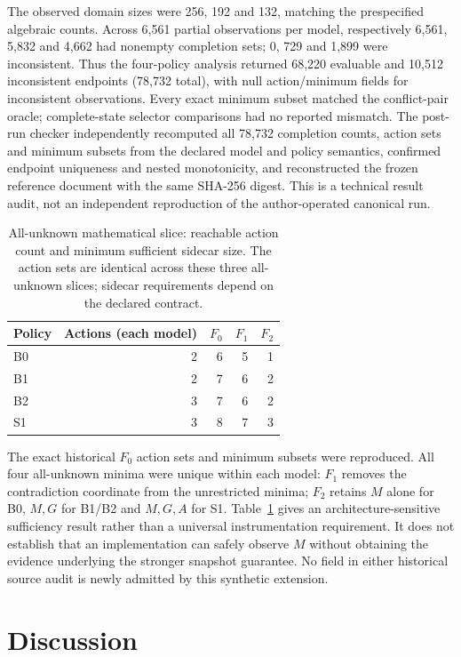 \documentclass[preprint,12pt]{elsarticle}
\begin{document}
The observed domain sizes were 256, 192 and 132, matching the prespecified algebraic counts. Across 6,561 partial observations per model, respectively 6,561, 5,832 and 4,662 had nonempty completion sets; 0, 729 and 1,899 were inconsistent. Thus the four-policy analysis returned 68,220 evaluable and 10,512 inconsistent endpoints (78,732 total), with null action/minimum fields for inconsistent observations. Every exact minimum subset matched the conflict-pair oracle; complete-state selector comparisons had no reported mismatch. The post-run checker independently recomputed all 78,732 completion counts, action sets and minimum subsets from the declared model and policy semantics, confirmed endpoint uniqueness and nested monotonicity, and reconstructed the frozen reference document with the same SHA-256 digest. This is a technical result audit, not an independent reproduction of the author-operated canonical run.

\begin{table}[H]
\centering
\small
\caption{All-unknown mathematical slice: reachable action count and minimum sufficient sidecar size. The action sets are identical across these three all-unknown slices; sidecar requirements depend on the declared contract.}
\label{tab:extensionsidecar}
\begin{tabular}{lrrrr}
\toprule
Policy & Actions (each model) & $F_0$ & $F_1$ & $F_2$ \\
\midrule
B0 & 2 & 6 & 5 & 1 \\
B1 & 2 & 7 & 6 & 2 \\
B2 & 3 & 7 & 6 & 2 \\
S1 & 3 & 8 & 7 & 3 \\
\bottomrule
\end{tabular}
\end{table}

The exact historical $F_0$ action sets and minimum subsets were reproduced. All four all-unknown minima were unique within each model: $F_1$ removes the contradiction coordinate from the unrestricted minima; $F_2$ retains $M$ alone for B0, $M,G$ for B1/B2 and $M,G,A$ for S1. Table~\ref{tab:extensionsidecar} gives an architecture-sensitive sufficiency result rather than a universal instrumentation requirement. It does not establish that an implementation can safely observe $M$ without obtaining the evidence underlying the stronger snapshot guarantee. No field in either historical source audit is newly admitted by this synthetic extension.

\section{Discussion}
\end{document}
